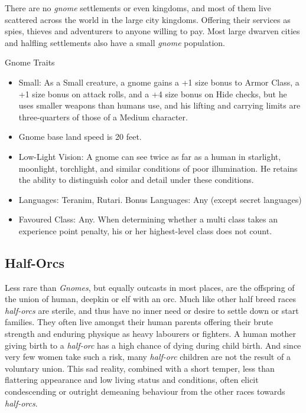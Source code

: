 There are no \emph{gnome} settlements or even kingdoms, and most of them live
scattered across the world in the large city kingdoms. Offering their services
as spies, thieves and adventurers to anyone willing to pay. Most large dwarven
cities and halfling settlements also have a small \emph{gnome} population.

\begin{35e}{Gnome Traits}
  \begin{itemize}[noitemsep]
    \item Small: As a Small creature, a gnome gains a +1 size bonus to Armor
    Class, a +1 size bonus on attack rolls, and a +4 size bonus on Hide
    checks, but he uses smaller weapons than humans use, and his lifting and
    carrying limits are three-quarters of those of a Medium character.
    \item Gnome base land speed is 20 feet.
    \item Low-Light Vision: A gnome can see twice as far as a human in
    starlight, moonlight, torchlight, and similar conditions of poor
    illumination. He retains the ability to distinguish color and detail under
    these conditions.
    \item Languages: Teranim, Rutari. Bonus Languages: Any (except secret
       languages)
    \item Favoured Class: Any. When determining whether a multi class takes an
    experience point penalty, his or her highest-level class does not count.
  \end{itemize}
\end{35e}

\subsection{Half-Orcs}
\label{sec:Half-Orcs}

Less rare than \emph{Gnomes}, but equally outcasts in most places, are the
offspring of the union of human, deepkin or elf with an orc. Much like other
half breed races \emph{half-orcs} are sterile, and thus have no inner need or
desire to settle down or start families. They often live amongst their human
parents offering their brute strength and enduring physique as heavy labourers
or fighters. A human mother giving birth to a \emph{half-orc} has a high
chance of dying during child birth. And since very few women take such a risk,
many \emph{half-orc} children are not the result of a voluntary union. This
sad reality, combined with a short temper, less than flattering appearance and
low living status and conditions, often elicit condescending or outright
demeaning behaviour from the other races towards \emph{half-orcs}.

